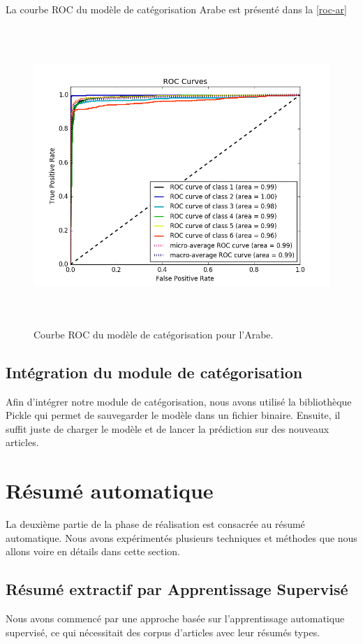     La courbe ROC du modèle de catégorisation Arabe est présenté dans la \autoref{roc-ar} 
    \begin{figure}[H]
        \centering
        \includegraphics[height=320pt,width=330pt]{img/chapter4/result/rocAR.png}
        \caption{Courbe ROC du modèle de catégorisation pour l'Arabe.}
        \label{roc-ar}
    \end{figure}
    
\subsection{Intégration du module de catégorisation}
Afin d'intégrer notre module de catégorisation, nous avons utilisé la bibliothèque Pickle qui permet de sauvegarder le modèle dans un fichier binaire. Ensuite, il suffit juste de charger le modèle et de lancer la prédiction sur des nouveaux articles.


\section{Résumé automatique}
La deuxième partie de la phase de réalisation est consacrée au résumé automatique. Nous avons expérimentés plusieurs techniques et méthodes que nous allons voire en détails dans cette section. 
\subsection{Résumé extractif par Apprentissage Supervisé}
Nous avons commencé par une approche basée sur l'apprentissage automatique supervisé, ce qui nécessitait des corpus d'articles avec leur résumés types.

